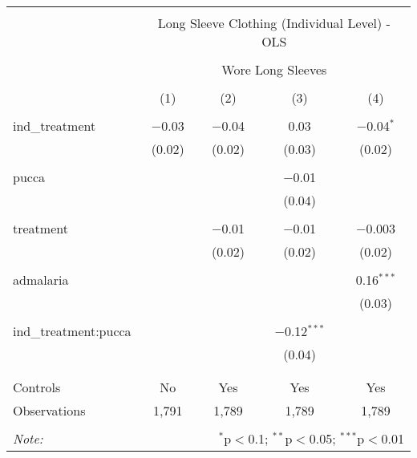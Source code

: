 
\begin{table}[!htbp] \centering 
  \caption{} 
  \label{tbl:Long Sleeve Clothing (Individual Level) - OLS} 
\begin{tabular}{@{\extracolsep{5pt}}lcccc} 
\\[-1.8ex]\hline 
\hline \\[-1.8ex] 
 & \multicolumn{4}{c}{Long Sleeve Clothing (Individual Level) - OLS} \\ 
\cline{2-5} 
\\[-1.8ex] & \multicolumn{4}{c}{Wore Long Sleeves} \\ 
\\[-1.8ex] & (1) & (2) & (3) & (4)\\ 
\hline \\[-1.8ex] 
 ind\_treatment & $-$0.03 & $-$0.04 & 0.03 & $-$0.04$^{*}$ \\ 
  & (0.02) & (0.02) & (0.03) & (0.02) \\ 
  & & & & \\ 
 pucca &  &  & $-$0.01 &  \\ 
  &  &  & (0.04) &  \\ 
  & & & & \\ 
 treatment &  & $-$0.01 & $-$0.01 & $-$0.003 \\ 
  &  & (0.02) & (0.02) & (0.02) \\ 
  & & & & \\ 
 admalaria &  &  &  & 0.16$^{***}$ \\ 
  &  &  &  & (0.03) \\ 
  & & & & \\ 
 ind\_treatment:pucca &  &  & $-$0.12$^{***}$ &  \\ 
  &  &  & (0.04) &  \\ 
  & & & & \\ 
\hline \\[-1.8ex] 
Controls & No & Yes & Yes & Yes \\ 
Observations & 1,791 & 1,789 & 1,789 & 1,789 \\ 
\hline 
\hline \\[-1.8ex] 
\textit{Note:}  & \multicolumn{4}{r}{$^{*}$p$<$0.1; $^{**}$p$<$0.05; $^{***}$p$<$0.01} \\ 
\end{tabular} 
\end{table} 
